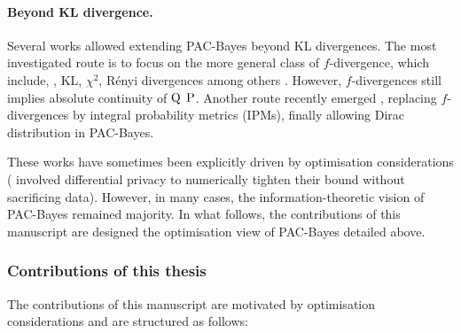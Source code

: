 \paragraph{Beyond KL divergence.} Several works allowed extending PAC-Bayes beyond KL divergences. The most investigated route is to focus on the more general class of $f$-divergence, which include, \eg, KL, $\chi^2$, Rényi divergences among others \citep{alquier2018simpler,ohnishi2021novel,picard2022change,viallard2023general}. However, $f$-divergences still implies absolute continuity of $\Q$ \wrt $\P$. Another route recently emerged \citep{amit2022integral}, replacing $f$-divergences by integral probability metrics (IPMs), finally allowing Dirac distribution in PAC-Bayes.


These works have sometimes been explicitly driven by optimisation considerations (\citealp{dziugaite2018data} involved differential privacy to numerically tighten their bound without sacrificing data). However, in many cases, the information-theoretic vision of PAC-Bayes remained majority. In what follows, the contributions of this manuscript are designed \wrt the optimisation view of PAC-Bayes detailed above. 

\subsubsection*{Contributions of this thesis}

The contributions of this manuscript are motivated by optimisation considerations and are structured as follows: 

